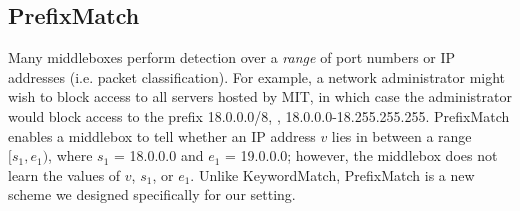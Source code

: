 %
%
%
%
%
%
%
%
%
%
%
%

\subsection{PrefixMatch} \label{sec:range}

Many middleboxes perform detection over a {\it range} of port numbers or IP addresses (i.e. packet classification). For example, a network administrator might wish to block access to all servers hosted by MIT, in which case the administrator would block access to the prefix 18.0.0.0/8, \ie{}, 18.0.0.0-18.255.255.255. PrefixMatch enables a middlebox to tell whether an IP address $v$ lies in between a range $[s_1, e_1)$, where $s_1$ = 18.0.0.0 and $e_1$ = 19.0.0.0; however, the middlebox does not learn the values of $v$, $s_1$, or $e_1$. Unlike KeywordMatch, PrefixMatch is a new scheme we designed specifically for our setting.

